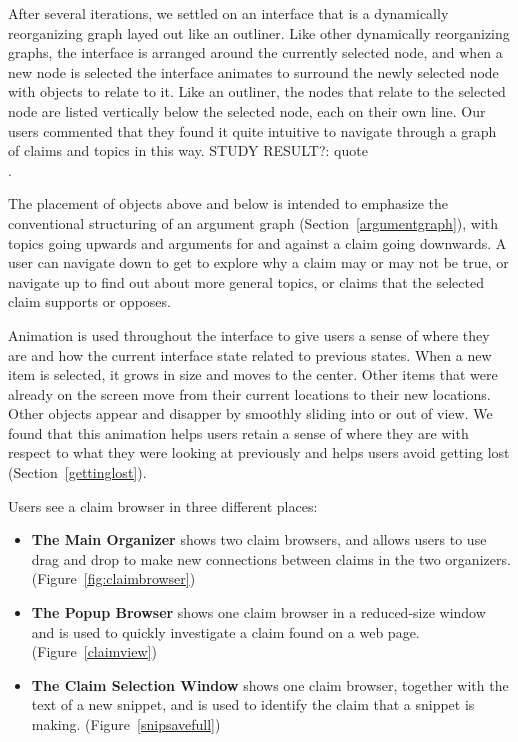\documentclass{chi2009}
\newcommand{\todo}[1]{}
\newcommand{\studyresult}[1]{{\color{red} STUDY RESULT?: #1}\\}
\begin{document}
\todo{This interface is actually closer to TheBrain than the text suggests}

After several iterations, we settled on an interface that is a dynamically reorganizing graph layed out like an outliner. Like other dynamically reorganizing graphs, the interface is arranged around the currently selected node, and when a new node is selected the interface animates to surround the newly selected node with objects to relate to it. Like an outliner, the nodes that relate to the selected node are listed vertically below the selected node, each on their own line. Our users commented that they found it quite intuitive to navigate through a graph of claims and topics in this way. \studyresult{quote}.

The placement of objects above and below is intended to emphasize the conventional structuring of an argument graph (Section~\ref{argumentgraph}), with topics going upwards and arguments for and against a claim going downwards. A user can navigate down to get to explore why a claim may or may not be true, or navigate up to find out about more general topics, or claims that the selected claim supports or opposes.

\todo{Have I seen an interface like this elsewhere? Did PARC have something like this?}

\todo{Is this interface a contribution in itself? Has an interface like this been presented before?}

Animation is used throughout the interface to give users a sense of where they are and how the current interface state related to previous states. When a new item is selected, it grows in size and moves to the center. Other items that were already on the screen move from their current locations to their new locations. Other objects appear and disapper by smoothly sliding into or out of view. We found that this animation helps users retain a sense of where they are with respect to what they were looking at previously and helps users avoid getting lost (Section~\ref{gettinglost}).

Users see a claim browser in three different places:
\begin{itemize}
\item {\bf The Main Organizer} shows two claim browsers, and allows users to use drag and drop to make new connections between claims in the two organizers. (Figure~\ref{fig:claimbrowser})
\item {\bf The Popup Browser} shows one claim browser in a reduced-size window and is used to quickly investigate a claim found on a web page. (Figure~\ref{claimview})
\item {\bf The Claim Selection Window} shows one claim browser, together with the text of a new snippet, and is used to identify the claim that a snippet is making. (Figure~\ref{snipsavefull}) 
\end{itemize}
\end{document}
